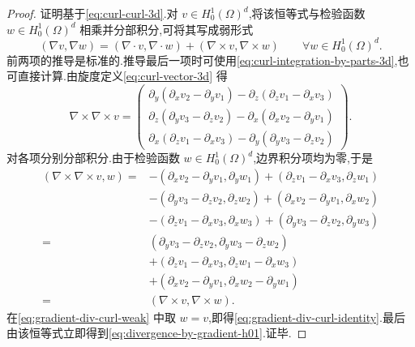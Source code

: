 \begin{proof}
证明基于\cref{eq:curl-curl-3d}.对 $v\in H_0^1(\Omega)^d$,将该恒等式与检验函数 $w\in H_0^1(\Omega)^d$ 相乘并分部积分,可将其写成弱形式
\begin{equation}\label{eq:gradient-div-curl-weak}
  (\nabla v,\nabla w)
   =(\nabla\cdot v,\nabla\cdot w)
     +(\nabla\times v,\nabla\times w)
     \qquad\forall w\in H_0^1(\Omega)^d.
\end{equation}
前两项的推导是标准的.推导最后一项时可使用\cref{eq:curl-integration-by-parts-3d},也可直接计算.由旋度定义\cref{eq:curl-vector-3d} 得
\[
\nabla\times\nabla\times v=
\begin{pmatrix}
  \partial_y(\partial_xv_2-\partial_yv_1)
    -\partial_z(\partial_zv_1-\partial_xv_3)\\
  \partial_z(\partial_yv_3-\partial_zv_2)
    -\partial_x(\partial_xv_2-\partial_yv_1)\\
  \partial_x(\partial_zv_1-\partial_xv_3)
    -\partial_y(\partial_yv_3-\partial_zv_2)
\end{pmatrix}.
\]
对各项分别分部积分.由于检验函数 $w\in H_0^1(\Omega)^d$,边界积分项均为零,于是
\[
\begin{aligned}
 (\nabla\times\nabla\times v,w)
   ={}&-(\partial_xv_2-\partial_yv_1,\partial_yw_1)
      +(\partial_zv_1-\partial_xv_3,\partial_zw_1)\\
     &-(\partial_yv_3-\partial_zv_2,\partial_zw_2)
      +(\partial_xv_2-\partial_yv_1,\partial_xw_2)\\
     &-(\partial_zv_1-\partial_xv_3,\partial_xw_3)
      +(\partial_yv_3-\partial_zv_2,\partial_yw_3)\\
   ={}&(\partial_yv_3-\partial_zv_2,
          \partial_yw_3-\partial_zw_2)\\
     &+(\partial_zv_1-\partial_xv_3,
          \partial_zw_1-\partial_xw_3)\\
     &+(\partial_xv_2-\partial_yv_1,
          \partial_xw_2-\partial_yw_1)\\
   ={}&(\nabla\times v,\nabla\times w).
\end{aligned}
\]
在\cref{eq:gradient-div-curl-weak} 中取 $w=v$,即得\cref{eq:gradient-div-curl-identity}.最后由该恒等式立即得到\cref{eq:divergence-by-gradient-h01}.证毕.
\end{proof}




